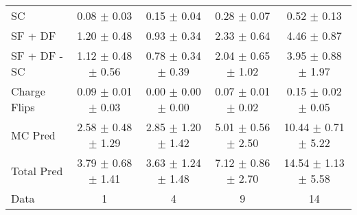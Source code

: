 \begin{tabular}{l|cccc}
                                 SC &  0.08 $\pm$  0.03 &  0.15 $\pm$  0.04 &  0.28 $\pm$  0.07 &  0.52 $\pm$  0.13 \\
                            SF + DF &  1.20 $\pm$  0.48 &  0.93 $\pm$  0.34 &  2.33 $\pm$  0.64 &  4.46 $\pm$  0.87 \\
\hline
                       SF + DF - SC &  1.12 $\pm$  0.48 $\pm$  0.56 &  0.78 $\pm$  0.34 $\pm$  0.39 &  2.04 $\pm$  0.65 $\pm$  1.02 &  3.95 $\pm$  0.88 $\pm$  1.97 \\
\hline\hline
                       Charge Flips &  0.09 $\pm$  0.01 $\pm$  0.03 &  0.00 $\pm$  0.00 $\pm$  0.00 &  0.07 $\pm$  0.01 $\pm$  0.02 &  0.15 $\pm$  0.02 $\pm$  0.05 \\
\hline
                            MC Pred &  2.58 $\pm$  0.48 $\pm$  1.29 &  2.85 $\pm$  1.20 $\pm$  1.42 &  5.01 $\pm$  0.56 $\pm$  2.50 & 10.44 $\pm$  0.71 $\pm$  5.22 \\
\hline
                         Total Pred &  3.79 $\pm$  0.68 $\pm$  1.41 &  3.63 $\pm$  1.24 $\pm$  1.48 &  7.12 $\pm$  0.86 $\pm$  2.70 & 14.54 $\pm$  1.13 $\pm$  5.58 \\
\hline\hline
                               Data &     1 &     4 &     9 &    14 \\
\hline\hline
\end{tabular}

